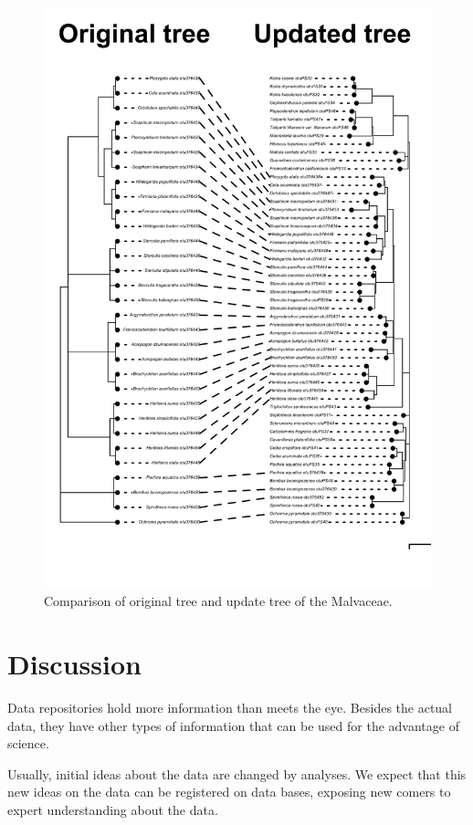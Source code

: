 \documentclass[]{article}
\begin{document}
\begin{figure}

{\centering \includegraphics[width=0.85\linewidth]{docs/figs/cotree-plot2-1} 

}

\caption{Comparison of original tree and update tree of the Malvaceae.}\label{fig:fig-2}
\end{figure}
\newpage

\hypertarget{discussion}{%
\section{Discussion}\label{discussion}}

Data repositories hold more information than meets the eye.
Besides the actual data, they have other types of information that can be used for the advantage of science.

Usually, initial ideas about the data are changed by analyses.
We expect that this new ideas on the data can be registered on data bases,
exposing new comers to expert understanding about the data.
\end{document}
